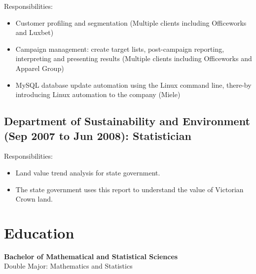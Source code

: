 \documentclass{moderncv}
\begin{document}
Responsibilities:
\begin{itemize}
    \item Customer profiling and segmentation (Multiple clients including Officeworks and Luxbet) 
    \item Campaign management: create target lists, post-campaign reporting, interpreting and presenting results (Multiple clients including Officeworks and Apparel Group)
    \item MySQL database update automation using the Linux command line, there\hyp{}by introducing Linux automation to the company (Miele)
\end{itemize}

\subsection{Department of Sustainability and Environment (Sep 2007 to Jun 2008): Statistician}

Responsibilities:
\begin{itemize}
    \item Land value trend analysis for state government.
    \item The state government uses this report to understand the value of Victorian Crown land.
\end{itemize}

\section{Education}
\textbf{Bachelor of Mathematical and Statistical Sciences}
\\
Double Major: Mathematics and Statistics
\end{document}
